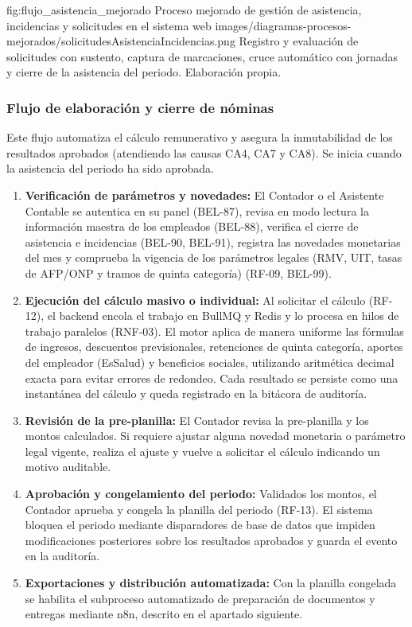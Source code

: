 \figuraEnTexto
    {fig:flujo_asistencia_mejorado}
    {Proceso mejorado de gestión de asistencia, incidencias y solicitudes en el sistema web}
    {images/diagramas-procesos-mejorados/solicitudesAsistenciaIncidencias.png}
    {Registro y evaluación de solicitudes con sustento, captura de marcaciones, cruce automático con jornadas y cierre de la asistencia del periodo. Elaboración propia.}

\subsubsection{Flujo de elaboración y cierre de nóminas}

Este flujo automatiza el cálculo remunerativo y asegura la inmutabilidad de los resultados aprobados (atendiendo las causas CA4, CA7 y CA8). Se inicia cuando la asistencia del periodo ha sido aprobada.

\begin{enumerate}
    \item \textbf{Verificación de parámetros y novedades:} El Contador o el Asistente Contable se autentica en su panel (BEL-87), revisa en modo lectura la información maestra de los empleados (BEL-88), verifica el cierre de asistencia e incidencias (BEL-90, BEL-91), registra las novedades monetarias del mes y comprueba la vigencia de los parámetros legales (RMV, UIT, tasas de AFP/ONP y tramos de quinta categoría) (RF-09, BEL-99).
    \item \textbf{Ejecución del cálculo masivo o individual:} Al solicitar el cálculo (RF-12), el backend encola el trabajo en BullMQ y Redis y lo procesa en hilos de trabajo paralelos (RNF-03). El motor aplica de manera uniforme las fórmulas de ingresos, descuentos previsionales, retenciones de quinta categoría, aportes del empleador (EsSalud) y beneficios sociales, utilizando aritmética decimal exacta para evitar errores de redondeo. Cada resultado se persiste como una instantánea del cálculo y queda registrado en la bitácora de auditoría.
    \item \textbf{Revisión de la pre-planilla:} El Contador revisa la pre-planilla y los montos calculados. Si requiere ajustar alguna novedad monetaria o parámetro legal vigente, realiza el ajuste y vuelve a solicitar el cálculo indicando un motivo auditable.
    \item \textbf{Aprobación y congelamiento del periodo:} Validados los montos, el Contador aprueba y congela la planilla del periodo (RF-13). El sistema bloquea el periodo mediante disparadores de base de datos que impiden modificaciones posteriores sobre los resultados aprobados y guarda el evento en la auditoría.
    \item \textbf{Exportaciones y distribución automatizada:} Con la planilla congelada se habilita el subproceso automatizado de preparación de documentos y entregas mediante n8n, descrito en el apartado siguiente.
\end{enumerate}

